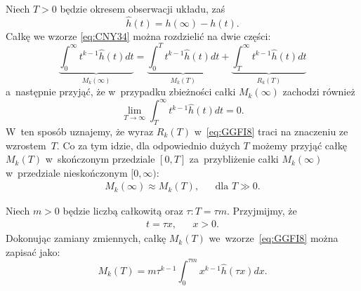 \documentclass[paper=a4,DIV=12]{lpas}
\begin{document}
\begin{appendices}
  Niech $T > 0$ będzie okresem obserwacji układu, zaś
  \begin{equation}
    \hat{h}(t) = h(\infty) - h(t).
    \label{eq:7S9M3}
  \end{equation}
  Całkę we wzorze \eqref{eq:CNY34} można rozdzielić na dwie części:
  \begin{equation}
    \underbrace{\int_0^{\infty} t^{k-1}\hat{h}(t) dt}_{M_k(\infty)}
      = \underbrace{\int_0^{T} t^{k-1}\hat{h}(t) dt}_{M_k(T)}
      + \underbrace{\int_{T}^{\infty} t^{k-1}\hat{h}(t) dt}_{R_k(T)}
    \label{eq:GGFI8}
  \end{equation}
  a~następnie przyjąć, że w~przypadku zbieżności całki $M_k(\infty)$ zachodzi
  również
  \begin{equation}
    \lim_{T \to \infty}\int_T^{\infty}{t^{k-1} \hat{h}(t) dt} = 0.
    \label{eq:DITCB}
  \end{equation}
  W~ten sposób uznajemy, że wyraz $R_k(T)$ w~\eqref{eq:GGFI8} traci na znaczeniu
  ze wzrostem~$T$. Co za tym idzie, dla odpowiednio dużych $T$ możemy przyjąć
  całkę $M_k(T)$ w~skończonym przedziale $[0,T]$ za~przybliżenie całki
  $M_k(\infty)$ w~przedziale nieskończonym $[0,\infty)$:
 \begin{equation}
   \begin{aligned}
      &M_k(\infty) \approx M_k(T), && \text{dla } T \gg 0.&
   \end{aligned}
   \label{eq:MZ4XJ}
 \end{equation}

  Niech $m > 0$ będzie liczbą całkowitą oraz $\tau:  T = \tau m$. Przyjmijmy, że
  \begin{equation}
    \begin{aligned}
      & t = \tau x, && x > 0.&
    \end{aligned}
    \label{eq:J7GYY}
  \end{equation}
  Dokonując zamiany zmiennych, całkę $M_k(T)$ we~wzorze~\eqref{eq:GGFI8} można
  zapisać jako:
  \begin{equation}
    M_k(T) = m \tau^{k-1} \int_0^{\tau m}{x^{k-1} \hat{h}(\tau x) dx}.
    \label{eq:R2WL9}
  \end{equation}


\end{appendices}
\end{document}

